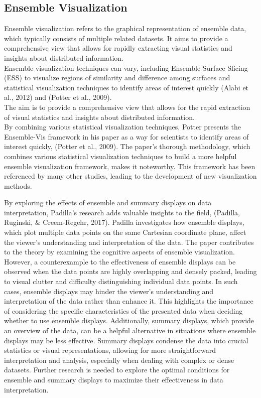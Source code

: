 \documentclass[print]{nuthesis}
\begin{document}
\hypertarget{ensemble-visualization}{%
\subsection{Ensemble Visualization}\label{ensemble-visualization}}

Ensemble visualization refers to the graphical representation of ensemble data, which typically consists of multiple related datasets.
It aims to provide a comprehensive view that allows for rapidly extracting visual statistics and insights about distributed information.\\
Ensemble visualization techniques can vary, including Ensemble Surface Slicing (ESS) to visualize regions of similarity and difference among surfaces and statistical visualization techniques to identify areas of interest quickly (Alabi et al., 2012) and (Potter et al., 2009).\\
The aim is to provide a comprehensive view that allows for the rapid extraction of visual statistics and insights about distributed information.\\
By combining various statistical visualization techniques, Potter presents the Ensemble-Vis framework in his paper as a way for scientists to identify areas of interest quickly, (Potter et al., 2009).
The paper's thorough methodology, which combines various statistical visualization techniques to build a more helpful ensemble visualization framework, makes it noteworthy.
This framework has been referenced by many other studies, leading to the development of new visualization methods.

By exploring the effects of ensemble and summary displays on data interpretation, Padilla's research adds valuable insights to the field, (Padilla, Ruginski, \& Creem-Regehr, 2017).
Padilla investigates how ensemble displays, which plot multiple data points on the same Cartesian coordinate plane, affect the viewer's understanding and interpretation of the data.
The paper contributes to the theory by examining the cognitive aspects of ensemble visualization.
However, a counterexample to the effectiveness of ensemble displays can be observed when the data points are highly overlapping and densely packed, leading to visual clutter and difficulty distinguishing individual data points.
In such cases, ensemble displays may hinder the viewer's understanding and interpretation of the data rather than enhance it.
This highlights the importance of considering the specific characteristics of the presented data when deciding whether to use ensemble displays.
Additionally, summary displays, which provide an overview of the data, can be a helpful alternative in situations where ensemble displays may be less effective.
Summary displays condense the data into crucial statistics or visual representations, allowing for more straightforward interpretation and analysis, especially when dealing with complex or dense datasets.
Further research is needed to explore the optimal conditions for ensemble and summary displays to maximize their effectiveness in data interpretation.
\end{document}
